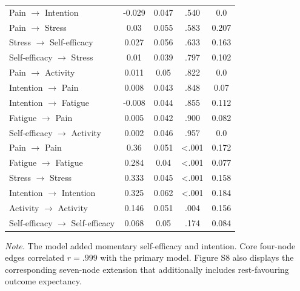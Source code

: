 \begin{table}[H]
\begin{tabular*}{\textwidth}{@{\extracolsep{\fill}}lcccc@{}}
Pain $\rightarrow$ Intention & -0.029 & 0.047 & .540 & 0.0 \\
Pain $\rightarrow$ Stress & 0.03 & 0.055 & .583 & 0.207 \\
Stress $\rightarrow$ Self-efficacy & 0.027 & 0.056 & .633 & 0.163 \\
Self-efficacy $\rightarrow$ Stress & 0.01 & 0.039 & .797 & 0.102 \\
Pain $\rightarrow$ Activity & 0.011 & 0.05 & .822 & 0.0 \\
Intention $\rightarrow$ Pain & 0.008 & 0.043 & .848 & 0.07 \\
Intention $\rightarrow$ Fatigue & -0.008 & 0.044 & .855 & 0.112 \\
Fatigue $\rightarrow$ Pain & 0.005 & 0.042 & .900 & 0.082 \\
Self-efficacy $\rightarrow$ Activity & 0.002 & 0.046 & .957 & 0.0 \\
Pain $\rightarrow$ Pain & 0.36 & 0.051 & <.001 & 0.172 \\
Fatigue $\rightarrow$ Fatigue & 0.284 & 0.04 & <.001 & 0.077 \\
Stress $\rightarrow$ Stress & 0.333 & 0.045 & <.001 & 0.158 \\
Intention $\rightarrow$ Intention & 0.325 & 0.062 & <.001 & 0.184 \\
Activity $\rightarrow$ Activity & 0.146 & 0.051 & .004 & 0.156 \\
Self-efficacy $\rightarrow$ Self-efficacy & 0.068 & 0.05 & .174 & 0.084 \\
\bottomrule
\end{tabular*}
\par\vspace{3pt}\noindent\parbox{\textwidth}{\scriptsize\textit{Note.} The model added momentary self-efficacy and intention. Core four-node edges correlated $r=.999$ with the primary model. Figure S8 also displays the corresponding seven-node extension that additionally includes rest-favouring outcome expectancy.}
\endgroup
\end{table}
